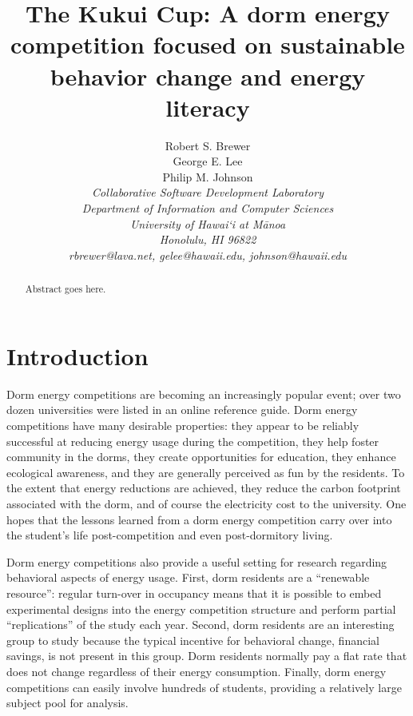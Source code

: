 \documentclass[conference,compsoc,peerreview]{IEEEtran}
\begin{document}
\title{The Kukui Cup: A dorm energy competition focused on sustainable behavior change and energy literacy}

\author{Robert S. Brewer\\
        George E. Lee \\
        Philip M. Johnson\\
\em     Collaborative Software Development Laboratory\\
        Department of Information and Computer Sciences\\
        University of Hawai`i at M\=anoa\\
        Honolulu, HI 96822\\
        rbrewer@lava.net, gelee@hawaii.edu, johnson@hawaii.edu\\
}


\IEEEpeerreviewmaketitle

\begin{abstract}  %
Abstract goes here.
\end{abstract}

\section{Introduction}
\label{sec:intro}

Dorm energy competitions are becoming an increasingly popular event; over
two dozen universities were listed in an online reference guide.  Dorm
energy competitions have many desirable properties: they appear to be
reliably successful at reducing energy usage during the competition, they
help foster community in the dorms, they create opportunities for
education, they enhance ecological awareness, and they are generally
perceived as fun by the residents.  To the extent that energy reductions
are achieved, they reduce the carbon footprint associated with the dorm,
and of course the electricity cost to the university. One hopes that the
lessons learned from a dorm energy competition carry over into the
student's life post-competition and even post-dormitory living.

Dorm energy competitions also provide a useful setting for research
regarding behavioral aspects of energy usage.  First, dorm residents are a
``renewable resource'': regular turn-over in occupancy means that it is
possible to embed experimental designs into the energy competition
structure and perform partial ``replications'' of the study each year.
Second, dorm residents are an interesting group to study because the
typical incentive for behavioral change, financial savings, is not present
in this group. Dorm residents normally pay a flat rate that does not change
regardless of their energy consumption.  Finally, dorm energy competitions
can easily involve hundreds of students, providing a relatively large
subject pool for analysis.
\end{document}
